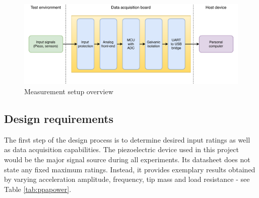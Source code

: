 \documentclass[12pt,a4paper]{article}
\begin{document}
\begin{figure}[h!]
\includegraphics[scale=0.8]{measurement_setup_overview.pdf}
\caption{Measurement setup overview}
\label{fig:meas_overview}
\end{figure}

\subsection{Design requirements}
The first step of the design process is to determine desired input ratings as well as data acquisition capabilities. The piezoelectric device used in this project would be the major signal source during all experiments. Its datasheet \cite{PPA} does not state any fixed maximum ratings. Instead, it provides exemplary results obtained by varying acceleration amplitude, frequency, tip mass and load resistance - see Table \ref{tab:ppapower}.\par
\end{document}

